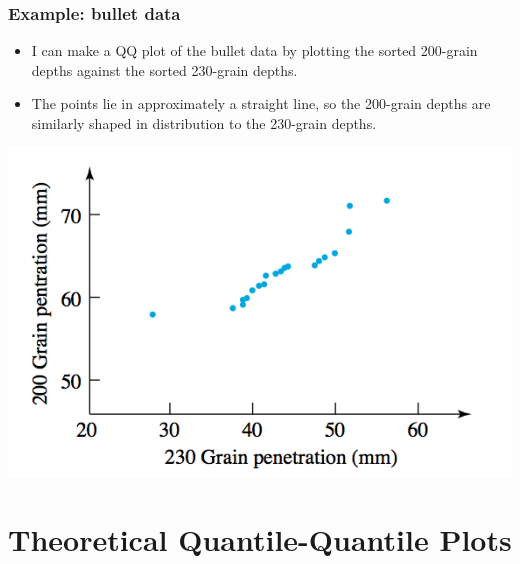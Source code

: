 \documentclass{beamer}
\numberwithin{equation}{section}
\begin{document}
\begin{frame}
\frametitle{Example: bullet data} \small
\begin{itemize}
\item I can make a QQ plot of the bullet data by plotting the sorted 200-grain depths against the sorted 230-grain depths.
\pause \item The points lie in approximately a straight line, so the 200-grain depths are similarly shaped in distribution to the 230-grain depths.
\end{itemize}

\begin{center}
 \includegraphics{../../fig/bulletqq.png}
\end{center}
\end{frame}


\section{Theoretical Quantile-Quantile Plots}
\end{document}
